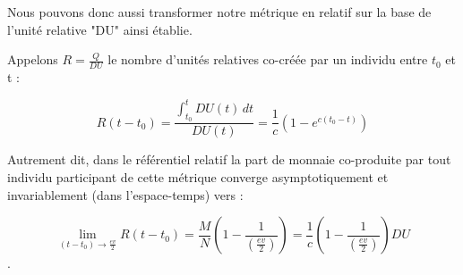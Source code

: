 \documentclass[a4paper,oneside,12pt]{article}
\begin{document}
Nous pouvons donc aussi transformer notre métrique en relatif sur la base de l'unité relative "DU" ainsi établie.

Appelons $R=\frac{Q}{DU}$ le nombre d'unités relatives co-créée par un individu entre $t_{0}$ et t :

\begin{center}
\begin{displaymath}R(t-t_{0})=\frac{\int_{t_{0}}^t DU(t) \, dt}{DU(t)}=\frac{1}{c}(1-e^{c(t_{0}-t)})\end{displaymath}
\end{center}

Autrement dit, dans le référentiel relatif la part de monnaie co-produite par tout individu participant de cette métrique converge asymptotiquement et invariablement (dans l'espace-temps) vers :

\begin{displaymath}\lim\limits_{(t-t_{0}) \to \frac{ev}{2}} R(t-t_{0}) = \frac{M}{N} \left(1-\frac{1}{(\frac{ev}{2})}\right) = \frac{1}{c} \left(1-\frac{1}{(\frac{ev}{2})}\right) DU \end{displaymath}.

~
\end{document}
